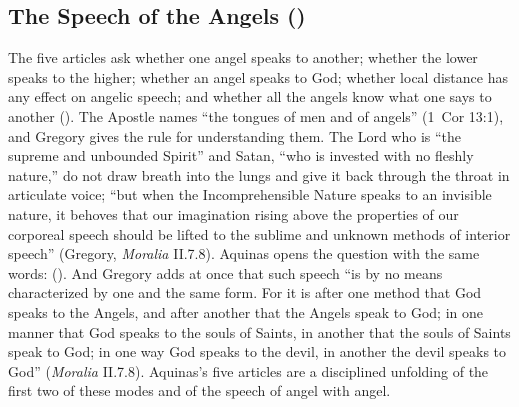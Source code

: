 \subsection{The Speech of the Angels ()}\label{sec:q107}

The five articles ask whether one angel speaks to another; whether the
lower speaks to the higher; whether an angel speaks to God; whether local
distance has any effect on angelic speech; and whether all the angels know
what one says to another (). The Apostle names ``the
tongues of men and of angels'' (1~Cor 13:1), and Gregory gives the rule for
understanding them. The Lord who is ``the supreme and unbounded Spirit'' and
Satan, ``who is invested with no fleshly nature,'' do not draw breath into
the lungs and give it back through the throat in articulate voice; ``but
when the Incomprehensible Nature speaks to an invisible nature, it behoves
that our imagination rising above the properties of our corporeal speech
should be lifted to the sublime and unknown methods of interior speech''
(Gregory, \emph{Moralia} II.7.8). Aquinas opens the question with the same
words: 
(). And Gregory adds at once that such speech ``is by
no means characterized by one and the same form. For it is after one method
that God speaks to the Angels, and after another that the Angels speak to
God; in one manner that God speaks to the souls of Saints, in another that
the souls of Saints speak to God; in one way God speaks to the devil, in
another the devil speaks to God'' (\emph{Moralia} II.7.8). Aquinas's five
articles are a disciplined unfolding of the first two of these modes and of
the speech of angel with angel.

